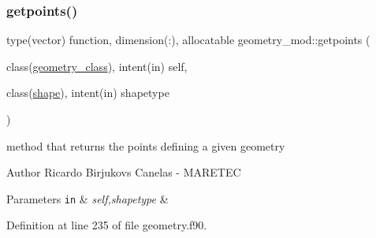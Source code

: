 \subsubsection{\texorpdfstring{getpoints()}{getpoints()}}
{\footnotesize\ttfamily type(vector) function, dimension(\+:), allocatable geometry\+\_\+mod\+::getpoints (\begin{DoxyParamCaption}\item[{class(\mbox{\hyperlink{structgeometry__mod_1_1geometry__class}{geometry\+\_\+class}}), intent(in)}]{self,  }\item[{class(\mbox{\hyperlink{structgeometry__mod_1_1shape}{shape}}), intent(in)}]{shapetype }\end{DoxyParamCaption})\hspace{0.3cm}{\ttfamily [private]}}



method that returns the points defining a given geometry 

\begin{DoxyAuthor}{Author}
Ricardo Birjukovs Canelas -\/ M\+A\+R\+E\+T\+EC 
\end{DoxyAuthor}

\begin{DoxyParams}[1]{Parameters}
\mbox{\tt in}  & {\em self,shapetype} & \\
\hline
\end{DoxyParams}


Definition at line 235 of file geometry.\+f90.


